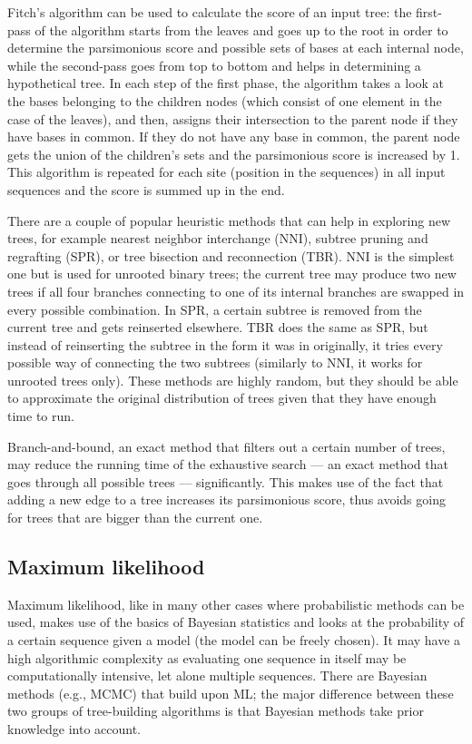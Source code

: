 \documentclass[11pt,twocolumn]{article}
\begin{document}
Fitch's algorithm can be used to calculate the score of an input tree: the first-pass of the algorithm starts from the leaves and goes up to the root in order to determine the parsimonious score and possible sets of bases at each internal node, while the second-pass goes from top to bottom and helps in determining a hypothetical tree. In each step of the first phase, the algorithm takes a look at the bases belonging to the children nodes (which consist of one element in the case of the leaves), and then, assigns their intersection to the parent node if they have bases in common. If they do not have any base in common, the parent node gets the union of the children's sets and the parsimonious score is increased by 1. This algorithm is repeated for each site (position in the sequences) in all input sequences and the score is summed up in the end.

There are a couple of popular heuristic methods that can help in exploring new trees, for example nearest neighbor interchange (NNI), subtree pruning and regrafting (SPR), or tree bisection and reconnection (TBR). NNI is the simplest one but is used for unrooted binary trees; the current tree may produce two new trees if all four branches connecting to one of its internal branches are swapped in every possible combination. In SPR, a certain subtree is removed from the current tree and gets reinserted elsewhere. TBR does the same as SPR, but instead of reinserting the subtree in the form it was in originally, it tries every possible way of connecting the two subtrees (similarly to NNI, it works for unrooted trees only). These methods are highly random, but they should be able to approximate the original distribution of trees given that they have enough time to run.

Branch-and-bound, an exact method that filters out a certain number of trees, may reduce the running time of the exhaustive search — an exact method that goes through all possible trees — significantly. This makes use of the fact that adding a new edge to a tree increases its parsimonious score, thus avoids going for trees that are bigger than the current one.

\subsection*{Maximum likelihood}

Maximum likelihood, like in many other cases where probabilistic methods can be used, makes use of the basics of Bayesian statistics and looks at the probability of a certain sequence given a model (the model can be freely chosen). It may have a high algorithmic complexity as evaluating one sequence in itself may be computationally intensive, let alone multiple sequences. There are Bayesian methods (e.g., MCMC) that build upon ML; the major difference between these two groups of tree-building algorithms is that Bayesian methods take prior knowledge into account.
\end{document}
